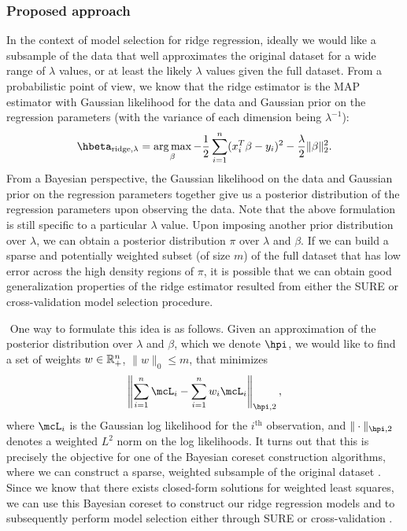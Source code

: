 \subsubsection{Proposed approach}
In the context of model selection for ridge regression, ideally we would like a subsample of the data that well approximates the original dataset for a wide range of $\lambda$ values, or at least the likely $\lambda$ values given the full dataset. From a probabilistic point of view, we know that the ridge estimator is the MAP estimator with Gaussian likelihood for the data and Gaussian prior on the regression parameters (with the variance of each dimension being $\lambda^{-1}$):
\[
\hbeta_{\text{ridge},\lambda} = \argmax_{\beta} -\frac{1}{2}\sum_{i=1}^n (x_i^T\beta - y_i)^2 - \frac{\lambda}{2}\|\beta\|_2^2.
\]
From a Bayesian perspective, the Gaussian likelihood on the data and Gaussian prior on the regression parameters together give us a posterior distribution of the regression parameters upon observing the data. Note that the above formulation is still specific to a particular $\lambda$ value. Upon imposing another prior distribution over $\lambda$, we can obtain a posterior distribution $\pi$ over $\lambda$ and $\beta$. If we can build a sparse and potentially weighted subset (of size $m$) of the full dataset that has low error across the high density regions of $\pi$, it is possible that we can obtain good generalization properties of the ridge estimator resulted from either the SURE or cross-validation model selection procedure.

$ $\newline
One way to formulate this idea is as follows. Given an approximation of the posterior distribution over $\lambda$ and $\beta$, which we denote $\hpi$, we would like to find a set of weights $w \in\mathbb{R}_+^n$, $\|w\|_0 \leq m$, that minimizes
\[
\left\| \sum_{i=1}^n \mcL_i - \sum_{i=1}^n w_i \mcL_i \right\|_{\hpi, 2},
\]
where $\mcL_i$ is the Gaussian log likelihood for the $i^\text{th}$ observation, and $\|\cdot\|_{\hpi, 2}$ denotes a weighted $L^2$ norm on the log likelihoods. It turns out that this is precisely the objective for one of the Bayesian coreset construction algorithms, where we can construct a sparse, weighted subsample of the original dataset \citep{campbell2019automated}. Since we know that there exists closed-form solutions for weighted least squares, we can use this Bayesian coreset to construct our ridge regression models and to subsequently perform model selection either through SURE or cross-validation \citep{strutz2011data}.

